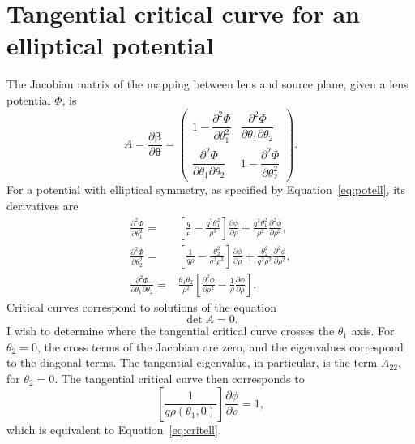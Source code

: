 \documentclass[usenatbib]{mnras}
\def\Eref#1{Equation~\ref{#1}\xspace}
\begin{document}
\section{Tangential critical curve for an elliptical potential}\label{sect:appendixe}
The Jacobian matrix of the mapping between lens and source plane, given a lens potential $\Phi$, is
\begin{equation}
A = \frac{\partial\boldsymbol\beta}{\partial\boldsymbol\theta} = \left(\begin{matrix} 1 - \dfrac{\partial^2\Phi}{\partial \theta_1^2} & \dfrac{\partial^2\Phi}{\partial\theta_1\partial\theta_2} \\ \dfrac{\partial^2\Phi}{\partial\theta_1\partial\theta_2} & 1 - \dfrac{\partial^2\Phi}{\partial \theta_2^2} \end{matrix}\right).
\end{equation}
For a potential with elliptical symmetry, as specified by \Eref{eq:potell}, its derivatives are
\begin{align}
\frac{\partial^2\Phi}{\partial\theta_1^2} = & \left[\frac{q}{\rho} - \frac{q^2\theta_1^2}{\rho^3}\right]\frac{\partial\phi}{\partial\rho} + \frac{q^2\theta_1^2}{\rho^2}\frac{\partial^2\phi}{\partial\rho^2}, \\
\frac{\partial^2\Phi}{\partial\theta_2^2} = & \left[\frac{1}{q\rho} - \frac{\theta_2^2}{q^2\rho^3}\right]\frac{\partial\phi}{\partial\rho} + \frac{\theta_2^2}{q^2\rho^2}\frac{\partial^2\phi}{\partial\rho^2}, \\
\frac{\partial^2\Phi}{\partial\theta_1\partial\theta_2} = & \frac{\theta_1\theta_2}{\rho^2}\left[\frac{\partial^2\phi}{\partial\rho^2} - \frac{1}{\rho}\frac{\partial\phi}{\partial\rho}\right].
\end{align}
Critical curves correspond to solutions of the equation
\begin{equation}
\det{A} = 0.
\end{equation}
I wish to determine where the tangential critical curve crosses the $\theta_1$ axis.
For $\theta_2=0$, the cross terms of the Jacobian are zero, and the eigenvalues correspond to the diagonal terms. The tangential eigenvalue, in particular, is the term $A_{22}$, for $\theta_2=0$. The tangential critical curve then corresponds to
\begin{equation}
\left[\frac{1}{q\rho(\theta_1, 0)}\right]\frac{\partial\phi}{\partial\rho} = 1,
\end{equation}
which is equivalent to \Eref{eq:critell}.
\end{document}
